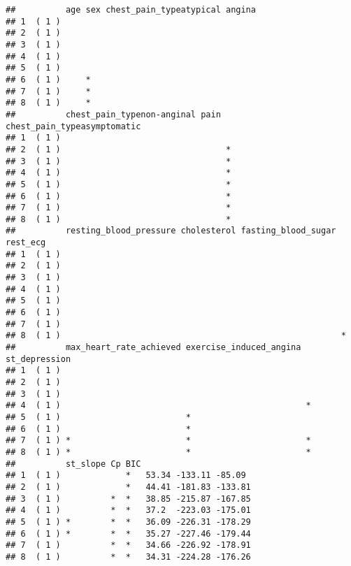 \documentclass[]{article}
\begin{document}
\begin{verbatim}
##          age sex chest_pain_typeatypical angina
## 1  ( 1 )                                       
## 2  ( 1 )                                       
## 3  ( 1 )                                       
## 4  ( 1 )                                       
## 5  ( 1 )                                       
## 6  ( 1 )     *                                 
## 7  ( 1 )     *                                 
## 8  ( 1 )     *                                 
##          chest_pain_typenon-anginal pain chest_pain_typeasymptomatic
## 1  ( 1 )                                                            
## 2  ( 1 )                                 *                          
## 3  ( 1 )                                 *                          
## 4  ( 1 )                                 *                          
## 5  ( 1 )                                 *                          
## 6  ( 1 )                                 *                          
## 7  ( 1 )                                 *                          
## 8  ( 1 )                                 *                          
##          resting_blood_pressure cholesterol fasting_blood_sugar rest_ecg
## 1  ( 1 )                                                                
## 2  ( 1 )                                                                
## 3  ( 1 )                                                                
## 4  ( 1 )                                                                
## 5  ( 1 )                                                                
## 6  ( 1 )                                                                
## 7  ( 1 )                                                                
## 8  ( 1 )                                                        *       
##          max_heart_rate_achieved exercise_induced_angina st_depression
## 1  ( 1 )                                                              
## 2  ( 1 )                                                              
## 3  ( 1 )                                                              
## 4  ( 1 )                                                 *            
## 5  ( 1 )                         *                                    
## 6  ( 1 )                         *                                    
## 7  ( 1 ) *                       *                       *            
## 8  ( 1 ) *                       *                       *            
##          st_slope Cp BIC                      
## 1  ( 1 )             *   53.34 -133.11 -85.09 
## 2  ( 1 )             *   44.41 -181.83 -133.81
## 3  ( 1 )          *  *   38.85 -215.87 -167.85
## 4  ( 1 )          *  *   37.2  -223.03 -175.01
## 5  ( 1 ) *        *  *   36.09 -226.31 -178.29
## 6  ( 1 ) *        *  *   35.27 -227.46 -179.44
## 7  ( 1 )          *  *   34.66 -226.92 -178.91
## 8  ( 1 )          *  *   34.31 -224.28 -176.26
\end{verbatim}
\end{document}
